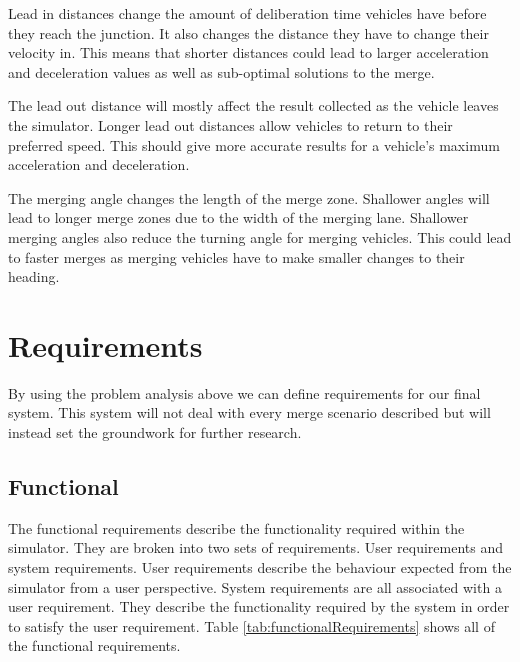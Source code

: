 Lead in distances change the amount of deliberation time vehicles have before they reach the junction. It also changes the distance they have to change their velocity in. This means that shorter distances could lead to larger acceleration and deceleration values as well as sub-optimal solutions to the merge.

The lead out distance will mostly affect the result collected as the vehicle leaves the simulator. Longer lead out distances allow vehicles to return to their preferred speed. This should give more accurate results for a vehicle's maximum acceleration and deceleration. 

The merging angle changes the length of the merge zone. Shallower angles will lead to longer merge zones due to the width of the merging lane. Shallower merging angles also reduce the turning angle for merging vehicles. This could lead to faster merges as merging vehicles have to make smaller changes to their heading.

\section{Requirements}
\label{sec:Requirements}
By using the problem analysis above we can define requirements for our final system. This system will not deal with every merge scenario described but will instead set the groundwork for further research.

\subsection{Functional}
\label{subsec:Functional}
The functional requirements describe the functionality required within the simulator. They are broken into two sets of requirements. User requirements and system requirements. User requirements describe the behaviour expected from the simulator from a user perspective. System requirements are all associated with a user requirement. They describe the functionality required by the system in order to satisfy the user requirement. Table \ref{tab:functionalRequirements} shows all of the functional requirements.

